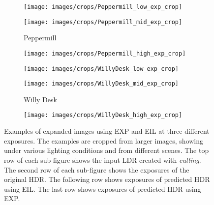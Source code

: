 \documentclass{egpubl}
\newcommand{\tc}[1]{{#1}}
\begin{document}
\begin{figure*}[htb]
    \begin{subfigure}[t]{0.13\linewidth}
        \centering
        \texttt{[image: images/crops/Peppermill\_low\_exp\_crop]}
    \end{subfigure}
    \begin{subfigure}[t]{0.13\linewidth}
        \centering
        \texttt{[image: images/crops/Peppermill\_mid\_exp\_crop]}
        \caption{Peppermill}\label{fig:exposures:peppermill}
    \end{subfigure}
    \begin{subfigure}[t]{0.13\linewidth}
        \centering
        \texttt{[image: images/crops/Peppermill\_high\_exp\_crop]}
    \end{subfigure}
    \begin{subfigure}[t]{0.13\linewidth}
        \centering
        \texttt{[image: images/crops/WillyDesk\_low\_exp\_crop]}
    \end{subfigure}
    \begin{subfigure}[t]{0.13\linewidth}
        \centering
        \texttt{[image: images/crops/WillyDesk\_mid\_exp\_crop]}
        \caption{Willy Desk}\label{fig:exposures:willydesk}
    \end{subfigure}
    \begin{subfigure}[t]{0.13\linewidth}
        \centering
        \texttt{[image: images/crops/WillyDesk\_high\_exp\_crop]}
    \end{subfigure}
    \caption{\tc{Examples of expanded images using EXP and EIL at three
    different exposures. The examples are cropped from larger images, showing
    under various lighting conditions and from different scenes. The top row of
    each sub-figure shows the input LDR created with \textit{culling}. The
    second row of each sub-figure shows the exposures of the original HDR. The
    following row shows exposures of predicted HDR using EIL. The last row
    shows exposures of predicted HDR using EXP.}}\label{fig:exposures}
\end{figure*}
 
\end{document}
